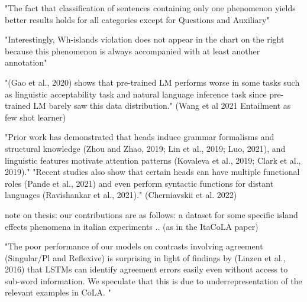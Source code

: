 

"The fact that classification of sentences containing only one phenomenon yields better results holds for all categories except for Questions and Auxiliary"

"Interestingly, Wh-islands violation
does not appear in the chart on the right because
this phenomenon is always accompanied with at
least another annotation"

"(Gao et al., 2020) shows that pre-trained LM performs worse in some tasks such
as linguistic acceptability task and natural language inference task since pre-trained LM barely saw
this data distribution." (Wang et al 2021 Entailment as few shot learner)

"Prior work has demonstrated that heads induce grammar formalisms and structural knowledge (Zhou and Zhao, 2019; Lin et al., 2019; Luo,
2021), and linguistic features motivate attention
patterns (Kovaleva et al., 2019; Clark et al., 2019)."
"Recent studies also show that certain heads can
have multiple functional roles (Pande et al., 2021)
and even perform syntactic functions for distant
languages (Ravishankar et al., 2021)."
(Cherniavskii et al. 2022)


note on thesis:
our contributions are as follows:
a dataset for some specific island effects phenomena in italian
experiments
..
(as in the ItaCoLA paper)


"The poor performance of our models on contrasts involving agreement (Singular/Pl and Reflexive) is surprising in light of findings by (Linzen
et al., 2016) that LSTMs can identify agreement
errors easily even without access to sub-word information. We speculate that this is due to underrepresentation of the relevant examples in CoLA.
"



